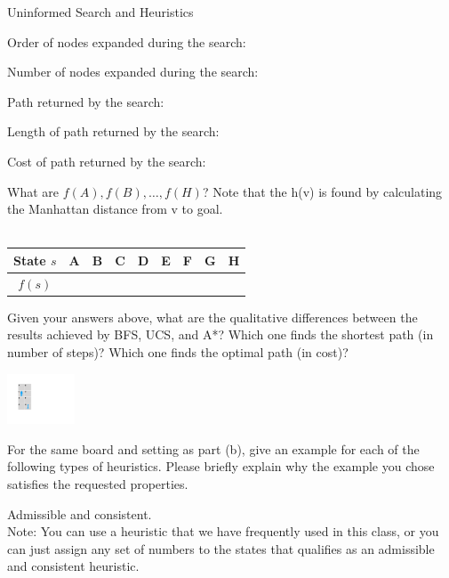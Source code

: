 \begin{problem}{Uninformed Search and Heuristics}
\begin{question}
\begin{subquestion}[8]
Order of nodes expanded during the search:

Number of nodes expanded during the search: 

Path returned by the search: 

Length of path returned by the search: 

Cost of path returned by the search: 

What are $f(A), f(B), \ldots, f(H)$? Note that the h(v) is found by calculating the Manhattan distance from v to goal. 
\\\\

\def\arraystretch{1.5}
\setlength\tabcolsep{15pt}
\begin{center}
\begin{tabular}{|c|c|c|c|c|c|c|c|c|}
    \hline
      State $s$ & A & B & C & D & E & F & G & H  \\
    \hline
      $f(s)$ &  &  &  &  &  &  &  &  \\
    \hline
\end{tabular}
\end{center}
\end{subquestion}

\end{question}

\newpage
\begin{question}[10]
Given your answers above, what are the qualitative differences between the results achieved by BFS, UCS, and A*? Which one finds the shortest path (in number of steps)? Which one finds the optimal path (in cost)?
\end{question}

\newpage
\begin{center}
\includegraphics[width=0.15\textwidth]{figures/simple_nodir.pdf}
\end{center}

\begin{question}
For the same board and setting as part (b), give an example for each of the following types of heuristics. Please briefly explain why the example you chose satisfies the requested properties.

\begin{subquestion}[3]
Admissible and consistent. \\
Note: You can use a heuristic that we have frequently used in this class, or you can just assign any set of numbers to the states that qualifies as an admissible and consistent heuristic.


\end{subquestion}
\end{question}
\end{problem}
